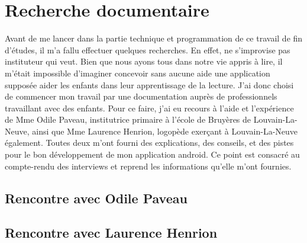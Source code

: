 \section{Recherche documentaire}
Avant de me lancer dans la partie technique et programmation de ce travail de fin d'études, il m'a fallu effectuer quelques recherches. En effet, ne s'improvise pas instituteur qui veut. Bien que nous ayons tous dans notre vie appris à lire, il m'était impossible d'imaginer concevoir sans aucune aide une application supposée aider les enfants dans leur apprentissage de la lecture. J'ai donc choisi de commencer mon travail par une documentation auprès de professionnels travaillant avec des enfants. Pour ce faire, j'ai eu recours à l'aide et l'expérience de Mme Odile Paveau, institutrice primaire à l'école de Bruyères de Louvain-La-Neuve, ainsi que Mme Laurence Henrion, logopède exerçant à Louvain-La-Neuve également. Toutes deux m'ont fourni des explications, des conseils, et des pistes pour le bon développement de mon application android. Ce point est consacré au compte-rendu des interviews et reprend les informations qu'elle m'ont fournies.

\subsection{Rencontre avec Odile Paveau}
\subsection{Rencontre avec Laurence Henrion}
